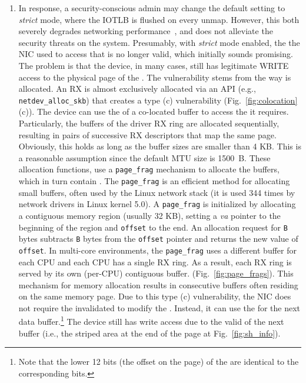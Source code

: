 \begin{enumerate}[label=(\roman*),wide, labelwidth=!, labelindent=0pt]
\item In response, a security-conscious admin may change the default setting to \emph{strict} mode, where the IOTLB is flushed on every unmap. However, this both severely degrades networking performance~\cite{MMT16,MSMT18}, and does not alleviate the security threats on the system. Presumably, with \emph{strict} mode enabled, the \iova{} the NIC used to access that \shinfo{} is no longer valid, which initially sounds promising. The problem is that the device, in many cases, still has legitimate WRITE access to the physical page of the \shinfo. The vulnerability stems from the way \data{} is allocated. An RX \skb{} is almost exclusively allocated via an API (e.g., \texttt{netdev\_alloc\_skb}) that creates a type (c) \subpage{} vulnerability (Fig.~\ref{fig:colocation}(c)). The device can use the \iova{} of a co-located buffer to access the \shinfo{} it requires. Particularly, the buffers of the driver RX ring are allocated sequentially, resulting in pairs of successive RX descriptors that map the same page. Obviously, this holds as long as the buffer sizes are smaller than 4 KB. This is a reasonable assumption since the default MTU size is 1500~B. These allocation functions, use a \texttt{page\_frag} mechanism to allocate the \data{} buffers, which in turn contain \shinfo. The \texttt{page\_frag} is an efficient method for allocating small buffers, often used by the Linux network stack (it is used 344 times by network drivers in Linux kernel 5.0). A \texttt{page\_frag} is initialized by allocating a contiguous memory region (usually 32 KB), setting a \textit{va} pointer to the beginning of the region and \texttt{offset} to the end. An allocation request for \texttt{B} bytes subtracts \texttt{B} bytes from the \texttt{offset} pointer and returns the new value of \texttt{offset}. In multi-core environments, the \texttt{page\_frag} uses a different buffer for each CPU and each CPU has a single RX ring. As a result, each RX ring is served by its own (per-CPU) contiguous buffer. (Fig.~\ref{fig:page_frags}). This mechanism for memory allocation results in consecutive \data{} buffers often residing on the same memory page. Due to this type (c) \subpage{} vulnerability, the NIC does not require the invalidated \iova{} to modify the \shinfo. Instead, it can use the \iova{} for the next data buffer.\footnote{Note that the lower 12 bits (the offset on the page) of the \iova{} are identical to the corresponding \kva{} bits.} The device still has write access due to the valid \iova of the next buffer (i.e., the striped area at the end of the page at Fig.~\ref{fig:sh_info}).
\end{enumerate}

